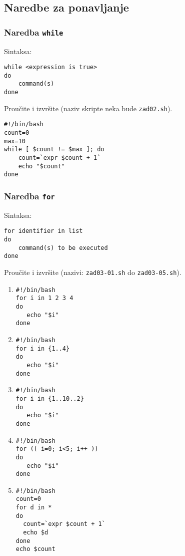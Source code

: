 \subsection*{Naredbe za ponavljanje}

\subsubsection*{Naredba \texttt{while}}
Sintaksa:
\begin{lstlisting}
while <expression is true>
do
    command(s)
done
\end{lstlisting}

\begin{zadatak} Proučite i izvršite (naziv skripte neka bude \texttt{zad02.sh}).
\begin{lstlisting}
#!/bin/bash
count=0
max=10
while [ $count != $max ]; do 
	count=`expr $count + 1`
    echo "$count"
done
\end{lstlisting}
\end{zadatak}

\subsubsection*{Naredba \texttt{for}}
Sintaksa:
\begin{lstlisting}
for identifier in list
do
    command(s) to be executed
done
\end{lstlisting}

\begin{zadatak} Proučite i izvršite (nazivi: \texttt{zad03-01.sh} do \texttt{zad03-05.sh}).
\begin{enumerate}
 \item
\begin{lstlisting}
#!/bin/bash
for i in 1 2 3 4 
do
   echo "$i"
done 
\end{lstlisting}

\item 
\begin{lstlisting}
#!/bin/bash
for i in {1..4}
do
   echo "$i"
done 
\end{lstlisting}

\item 
\begin{lstlisting}
#!/bin/bash
for i in {1..10..2}
do
   echo "$i"
done 
\end{lstlisting}

\item 
\begin{lstlisting}
#!/bin/bash
for (( i=0; i<5; i++ ))
do
   echo "$i"
done 
\end{lstlisting}

\item 
\begin{lstlisting}
#!/bin/bash
count=0
for d in *
do
  count=`expr $count + 1`
  echo $d
done
echo $count
\end{lstlisting}
\end{enumerate}
\end{zadatak}


